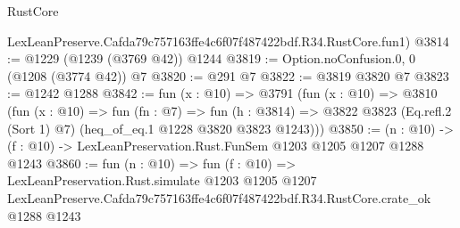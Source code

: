 \begin{lexlean}{RustCore}
\begin{coremodule}
    LexLeanPreserve.Cafda79c757163ffe4c6f07f487422bdf.R34.RustCore.fun1)
@3814 := @1229 (@1239 (@3769 @42)) @1244
@3819 := Option.noConfusion.{0, 0} (@1208 (@3774 @42)) @7
@3820 := @291 @7
@3822 := @3819 @3820 @7
@3823 := @1242 @1288
@3842 := fun (x : @10) =>
  @3791
    (fun (x : @10) =>
    @3810
      (fun (x : @10) =>
      fun (fn : @7) =>
      fun (h : @3814) =>
      @3822 @3823 (Eq.refl.{2} (Sort 1) @7) (heq_of_eq.{1} @1228 @3820 @3823 @1243)))
@3850 := (n : @10) -> (f : @10) -> LexLeanPreservation.Rust.FunSem @1203 @1205 @1207 @1288 @1243
@3860 := fun (n : @10) =>
  fun (f : @10) =>
  LexLeanPreservation.Rust.simulate
    @1203
    @1205
    @1207
    LexLeanPreserve.Cafda79c757163ffe4c6f07f487422bdf.R34.RustCore.crate_ok
    @1288
    @1243
\end{coremodule}
\end{lexlean}
